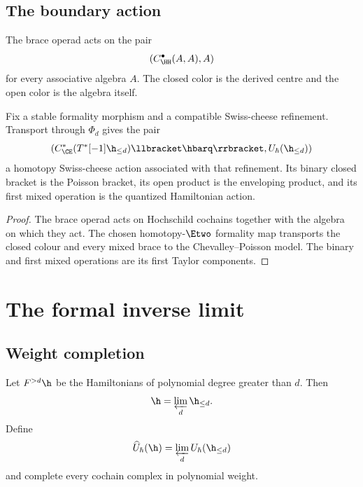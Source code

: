 \section{The boundary action}
The brace operad acts on the pair
\[
 \left(C^\bullet_{\HH}(A,A),A\right)
\]
for every associative algebra $A$.  The closed color is the derived centre and the open color is the algebra itself.

\begin{corollary}
Fix a stable formality morphism and a compatible Swiss-cheese refinement.  Transport through $\Phi_d$ gives the pair
\[
 \left(
 C^*_{\CE}(T^*[-1]\h_{\le d})\llbracket\hbarq\rrbracket,
 U_\hbar(\h_{\le d})
 \right)
\]
a homotopy Swiss-cheese action associated with that refinement.  Its binary closed bracket is the Poisson bracket, its open product is the enveloping product, and its first mixed operation is the quantized Hamiltonian action.
\end{corollary}
\begin{proof}
The brace operad acts on Hochschild cochains together with the algebra on which they act.  The chosen homotopy-$\Etwo$ formality map transports the closed colour and every mixed brace to the Chevalley--Poisson model.  The binary and first mixed operations are its first Taylor components.
\end{proof}

\chapter{The formal inverse limit}
\section{Weight completion}
Let $F^{>d}\h$ be the Hamiltonians of polynomial degree greater than $d$.  Then
\[
 \h=\varprojlim_d\h_{\le d}.
\]
Define
\[
 \widehat U_\hbar(\h)=\varprojlim_d U_\hbar(\h_{\le d})
\]
and complete every cochain complex in polynomial weight.

